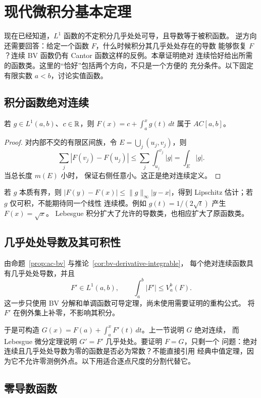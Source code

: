 \chapter{现代微积分基本定理}
\label{chap:modern-ftc}

现在已经知道，\(L^1\) 函数的不定积分几乎处处可导，且导数等于被积函数。
逆方向还需要回答：给定一个函数 \(F\)，什么时候积分其几乎处处存在的导数
能够恢复 \(F\)？连续 BV 函数仍有 Cantor 函数这样的反例。本章证明绝对
连续恰好给出所需的函数类。这里的“恰好”包括两个方向，不只是一个方便的
充分条件。以下固定有限实数 \(a<b\)，讨论实值函数。

\section{积分函数绝对连续}

\begin{theorem}\label{thm:integral-is-ac}
若 \(g\in L^1(a,b)\)、\(c\in\mathbb{R}\)，则 \(F(x)=c+\int_a^xg(t)\,dt\) 属于 \(AC[a,b]\)。
\end{theorem}
\begin{proof}
对内部不交的有限区间族，令 \(E=\bigcup_j(u_j,v_j)\)，则
\[
 \sum_j|F(v_j)-F(u_j)|\le\sum_j\int_{u_j}^{v_j}|g|=\int_E|g|.
\]
当总长度 \(m(E)\) 小时，
保证右侧任意小。这正是绝对连续定义。
\end{proof}

若 \(g\) 本质有界，则
\(|F(y)-F(x)|\le\|g\|_\infty|y-x|\)，得到 Lipschitz 估计；若 \(g\) 仅可积，不能期待同一个线性
连续模。例如 \(g(t)=1/(2\sqrt t)\) 产生 \(F(x)=\sqrt x\)。
Lebesgue 积分扩大了允许的导数类，也相应扩大了原函数类。

\section{几乎处处导数及其可积性}

由命题~\ref{prop:ac-bv} 与推论~\ref{cor:bv-derivative-integrable}，
每个绝对连续函数具有几乎处处导数，并且
\[
 F'\in L^1(a,b),\qquad \int_a^b|F'|\le V_a^b(F).
\]
这一步只使用 BV 分解和单调函数可导定理，尚未使用需要证明的重构公式。
将 \(F'\) 在例外集上补零，不影响其积分。

于是可构造 \(G(x)=F(a)+\int_a^xF'(t)\,dt\)。上一节说明 \(G\) 绝对连续，
而 Lebesgue 微分定理说明 \(G'=F'\) 几乎处处。要证明 \(F=G\)，只剩一个
问题：绝对连续且几乎处处导数为零的函数是否必为常数？不能直接引用
经典中值定理，因为它不允许零测例外点。以下用适合逐点尺度的分割代替它。

\section{零导数函数}

